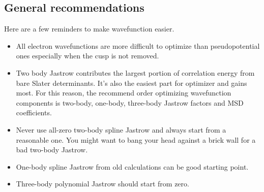 \subsection{General recommendations}
Here are a few reminders to make wavefunction easier.
\begin{itemize}
\item All electron wavefunctions are more difficult to optimize than pseudopotential ones especially when the cusp is not removed.
\item Two body Jastrow contributes the largest portion of correlation energy from bare Slater determinants. It's also the easiest part for optimizer and gains most. For this reason, the recommend order optimizing wavefunction components is two-body, one-body, three-body Jastrow factors and MSD coefficients.
\item Never use all-zero two-body spline Jastrow and always start from a reasonable one. 
      You might want to bang your head against a brick wall for a bad two-body Jastrow.
\item One-body spline Jastrow from old calculations can be good starting point.
\item Three-body polynomial Jastrow should start from zero.
\end{itemize}

\label{sec:optimization}

